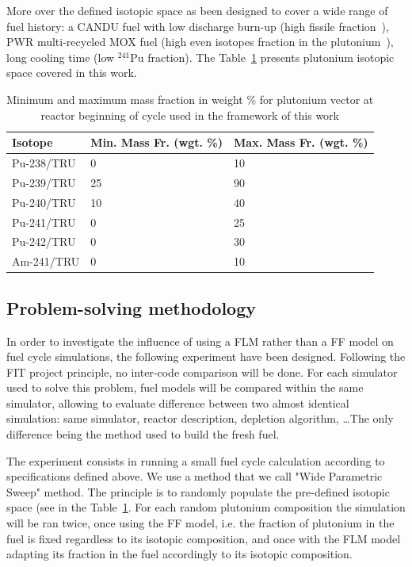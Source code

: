 More over the defined isotopic space as been designed to cover a wide range of
fuel history: a CANDU fuel with low discharge burn-up (high fissile
fraction~\cite{Guillemin_2010}), \gls{PWR} multi-recycled MOX fuel (high even
isotopes fraction in the plutonium~\cite{Courtin_2016}), long cooling time (low
$^{241}$Pu fraction). The Table~\ref{tab:PuVector} presents plutonium isotopic
space covered in this work.

\begin{table}[h]
\centering
\begin{tabular}{ |l|l|l| }
  \hline
  Isotope & Min. Mass Fr. (wgt. \%) & Max. Mass Fr. (wgt. \%) \\
  \hline
  Pu-238/TRU & 0  & 10 \\
  \hline
  Pu-239/TRU & 25 & 90 \\
  \hline
  Pu-240/TRU & 10 & 40 \\
  \hline
  Pu-241/TRU & 0  & 25 \\
  \hline
  Pu-242/TRU & 0  & 30 \\
  \hline
  Am-241/TRU & 0  & 10 \\
  \hline
\end{tabular}
\label{tab:PuVector}
\caption{Minimum and maximum mass fraction in weight \% for plutonium vector at
        reactor beginning of cycle used in the framework of this work}
\end{table}

\subsection{Problem-solving methodology}

In order to investigate the influence of using a \gls{FLM} rather than a
\gls{FF} model on fuel cycle simulations, the following experiment have been
designed. Following the FIT project principle, no inter-code comparison will be
done. For each simulator used to solve this problem, fuel models will be
compared within the same simulator, allowing to evaluate difference between two
almost identical simulation: same simulator, reactor description, depletion
algorithm, \ldots The only difference being the method used to build the fresh fuel.

The experiment consists in running a small fuel cycle calculation according to
specifications defined above. We use a method that we call "Wide Parametric
Sweep" method. The principle is to randomly populate the pre-defined isotopic
space (see in the Table~\ref{tab:PuVector}. For each random plutonium
composition the simulation will be ran twice, once using the \gls{FF} model,
i.e. the fraction of plutonium in the fuel is fixed regardless to its isotopic
composition, and once with the \gls{FLM} model adapting its fraction in the fuel
accordingly to its isotopic composition. 

